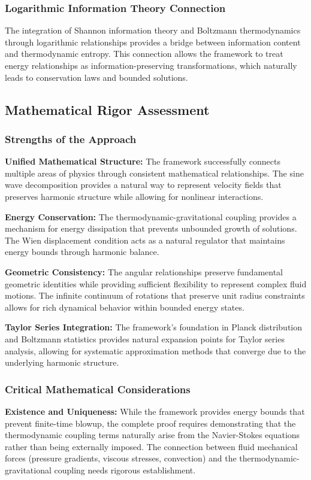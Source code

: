 ﻿\documentclass[12pt]{article}
\begin{document}
\subsubsection{Logarithmic Information Theory Connection}
The integration of Shannon information theory and Boltzmann thermodynamics through logarithmic relationships provides a bridge between information content and thermodynamic entropy. This connection allows the framework to treat energy relationships as information-preserving transformations, which naturally leads to conservation laws and bounded solutions.

\subsection{Mathematical Rigor Assessment}
\subsubsection{Strengths of the Approach}
\textbf{Unified Mathematical Structure:} The framework successfully connects multiple areas of physics through consistent mathematical relationships. The sine wave decomposition provides a natural way to represent velocity fields that preserves harmonic structure while allowing for nonlinear interactions.

\textbf{Energy Conservation:} The thermodynamic-gravitational coupling provides a mechanism for energy dissipation that prevents unbounded growth of solutions. The Wien displacement condition acts as a natural regulator that maintains energy bounds through harmonic balance.

\textbf{Geometric Consistency:} The angular relationships preserve fundamental geometric identities while providing sufficient flexibility to represent complex fluid motions. The infinite continuum of rotations that preserve unit radius constraints allows for rich dynamical behavior within bounded energy states.

\textbf{Taylor Series Integration:} The framework's foundation in Planck distribution and Boltzmann statistics provides natural expansion points for Taylor series analysis, allowing for systematic approximation methods that converge due to the underlying harmonic structure.

\subsubsection{Critical Mathematical Considerations}
\textbf{Existence and Uniqueness:} While the framework provides energy bounds that prevent finite-time blowup, the complete proof requires demonstrating that the thermodynamic coupling terms naturally arise from the Navier-Stokes equations rather than being externally imposed. The connection between fluid mechanical forces (pressure gradients, viscous stresses, convection) and the thermodynamic-gravitational coupling needs rigorous establishment.
\end{document}
